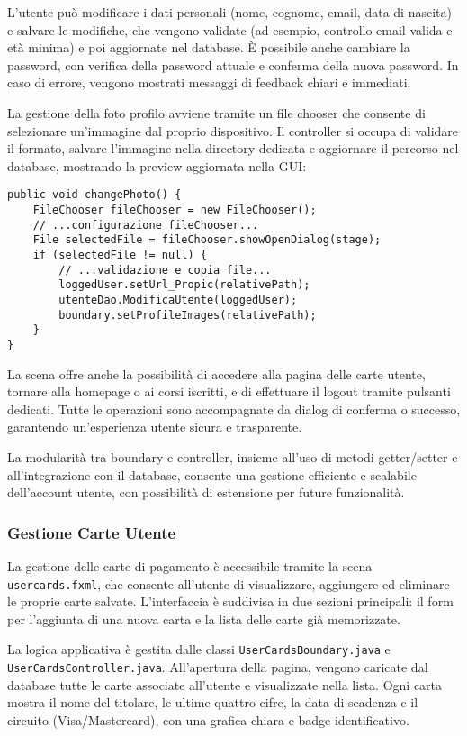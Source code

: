 L'utente può modificare i dati personali (nome, cognome, email, data di nascita) e salvare le modifiche, che vengono validate (ad esempio, controllo email valida e età minima) e poi aggiornate nel database. È possibile anche cambiare la password, con verifica della password attuale e conferma della nuova password. In caso di errore, vengono mostrati messaggi di feedback chiari e immediati.

La gestione della foto profilo avviene tramite un file chooser che consente di selezionare un'immagine dal proprio dispositivo. Il controller si occupa di validare il formato, salvare l'immagine nella directory dedicata e aggiornare il percorso nel database, mostrando la preview aggiornata nella GUI:
\begin{verbatim}
public void changePhoto() {
    FileChooser fileChooser = new FileChooser();
    // ...configurazione fileChooser...
    File selectedFile = fileChooser.showOpenDialog(stage);
    if (selectedFile != null) {
        // ...validazione e copia file...
        loggedUser.setUrl_Propic(relativePath);
        utenteDao.ModificaUtente(loggedUser);
        boundary.setProfileImages(relativePath);
    }
}
\end{verbatim}

La scena offre anche la possibilità di accedere alla pagina delle carte utente, tornare alla homepage o ai corsi iscritti, e di effettuare il logout tramite pulsanti dedicati. Tutte le operazioni sono accompagnate da dialog di conferma o successo, garantendo un'esperienza utente sicura e trasparente.

La modularità tra boundary e controller, insieme all'uso di metodi getter/setter e all'integrazione con il database, consente una gestione efficiente e scalabile dell'account utente, con possibilità di estensione per future funzionalità.

\subsubsection{Gestione Carte Utente}
La gestione delle carte di pagamento è accessibile tramite la scena \texttt{usercards.fxml}, che consente all'utente di visualizzare, aggiungere ed eliminare le proprie carte salvate. L'interfaccia è suddivisa in due sezioni principali: il form per l'aggiunta di una nuova carta e la lista delle carte già memorizzate.

La logica applicativa è gestita dalle classi \texttt{UserCardsBoundary.java} e \texttt{UserCardsController.java}. All'apertura della pagina, vengono caricate dal database tutte le carte associate all'utente e visualizzate nella lista. Ogni carta mostra il nome del titolare, le ultime quattro cifre, la data di scadenza e il circuito (Visa/Mastercard), con una grafica chiara e badge identificativo.


